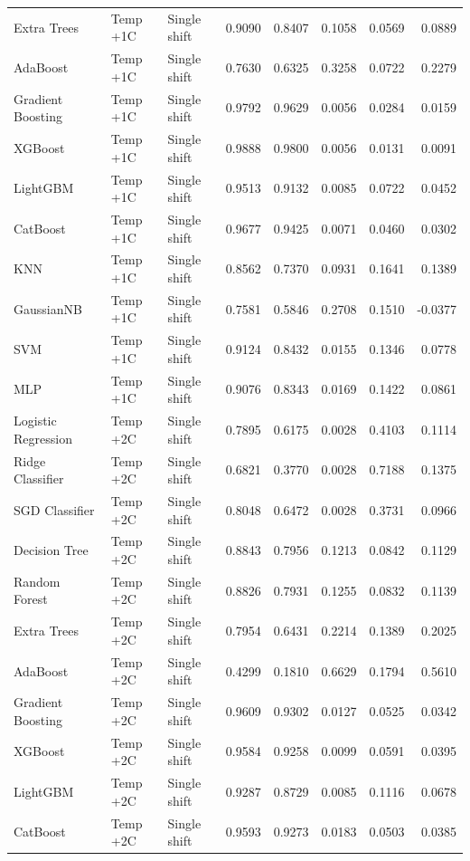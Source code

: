 \begin{tabular}{lllrrrrr}
Extra Trees & Temp +1C & Single shift & 0.9090 & 0.8407 & 0.1058 & 0.0569 & 0.0889 \\
AdaBoost & Temp +1C & Single shift & 0.7630 & 0.6325 & 0.3258 & 0.0722 & 0.2279 \\
Gradient Boosting & Temp +1C & Single shift & 0.9792 & 0.9629 & 0.0056 & 0.0284 & 0.0159 \\
XGBoost & Temp +1C & Single shift & 0.9888 & 0.9800 & 0.0056 & 0.0131 & 0.0091 \\
LightGBM & Temp +1C & Single shift & 0.9513 & 0.9132 & 0.0085 & 0.0722 & 0.0452 \\
CatBoost & Temp +1C & Single shift & 0.9677 & 0.9425 & 0.0071 & 0.0460 & 0.0302 \\
KNN & Temp +1C & Single shift & 0.8562 & 0.7370 & 0.0931 & 0.1641 & 0.1389 \\
GaussianNB & Temp +1C & Single shift & 0.7581 & 0.5846 & 0.2708 & 0.1510 & -0.0377 \\
SVM & Temp +1C & Single shift & 0.9124 & 0.8432 & 0.0155 & 0.1346 & 0.0778 \\
MLP & Temp +1C & Single shift & 0.9076 & 0.8343 & 0.0169 & 0.1422 & 0.0861 \\
Logistic Regression & Temp +2C & Single shift & 0.7895 & 0.6175 & 0.0028 & 0.4103 & 0.1114 \\
Ridge Classifier & Temp +2C & Single shift & 0.6821 & 0.3770 & 0.0028 & 0.7188 & 0.1375 \\
SGD Classifier & Temp +2C & Single shift & 0.8048 & 0.6472 & 0.0028 & 0.3731 & 0.0966 \\
Decision Tree & Temp +2C & Single shift & 0.8843 & 0.7956 & 0.1213 & 0.0842 & 0.1129 \\
Random Forest & Temp +2C & Single shift & 0.8826 & 0.7931 & 0.1255 & 0.0832 & 0.1139 \\
Extra Trees & Temp +2C & Single shift & 0.7954 & 0.6431 & 0.2214 & 0.1389 & 0.2025 \\
AdaBoost & Temp +2C & Single shift & 0.4299 & 0.1810 & 0.6629 & 0.1794 & 0.5610 \\
Gradient Boosting & Temp +2C & Single shift & 0.9609 & 0.9302 & 0.0127 & 0.0525 & 0.0342 \\
XGBoost & Temp +2C & Single shift & 0.9584 & 0.9258 & 0.0099 & 0.0591 & 0.0395 \\
LightGBM & Temp +2C & Single shift & 0.9287 & 0.8729 & 0.0085 & 0.1116 & 0.0678 \\
CatBoost & Temp +2C & Single shift & 0.9593 & 0.9273 & 0.0183 & 0.0503 & 0.0385 \\

\end{tabular}
